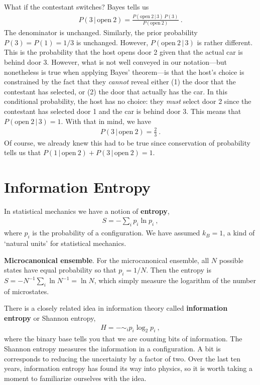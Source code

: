 What if the contestant switches? Bayes tells us
\begin{align}
	P(3\,|\,\text{open}~2) = \frac{P(\text{open}~2\,|\,3)\, P(3)}{P(\text{open}~2)} \ .
\end{align}
The denominator is unchanged. Similarly, the prior probability $P(3)=P(1)=1/3$ is unchanged. However, $P(\text{open}~2\,|\,3)$ is rather different. This is the probability that the host opens door 2 given that the actual car is behind door 3. However, what is not well conveyed in our notation---but nonetheless is true when applying Bayes' theorem---is that the host's choice is constrained by the fact that they \emph{cannot} reveal either (1) the door that the contestant has selected, or (2) the door that actually has the car. In this conditional probability, the host has no choice: they \emph{must} select door 2 since the contestant has selected door 1 and the car is behind door 3. This means that $P(\text{open}~2\,|\,3) = 1$. With that in mind, we have
\begin{align}
	P(3\,|\,\text{open}~2) = \frac{2}{3} \ .
\end{align}
Of course, we already knew this had to be true since conservation of probability tells us that $P(1\,|\,\text{open}~2)+P(3\,|\,\text{open}~2)=1$.

\section{Information Entropy}

In statistical mechanics we have a notion of \textbf{entropy},
\begin{align}
	S = -\sum_i p_i \ln p_i \ ,
\end{align}
where $p_i$ is the probability of a configuration. We have assumed $k_B=1$, a kind of `natural units' for statistical mechanics. 

\begin{example}
\textbf{Microcanonical ensemble}. For the microcanonical ensemble, all $N$ possible states have equal probability so that $p_i = 1/N$. Then the entropy is $S = -N^{-1}\sum_i\ln N^{-1} = \ln N$, which simply measure the logarithm of the number of microstates. 
\end{example}

There is a closely related idea in information theory called \textbf{information entropy} or Shannon entropy,
\begin{align}
	H = -\sim_i p_i \log_2 p_i \ ,
\end{align}
where the binary base tells you that we are counting bits of information. The Shannon entropy measures the information in a configuration. A bit is corresponds to reducing the uncertainty by a factor of two. Over the last ten years, information entropy has found its way into physics, so it is worth taking a moment to familiarize ourselves with the idea. 

